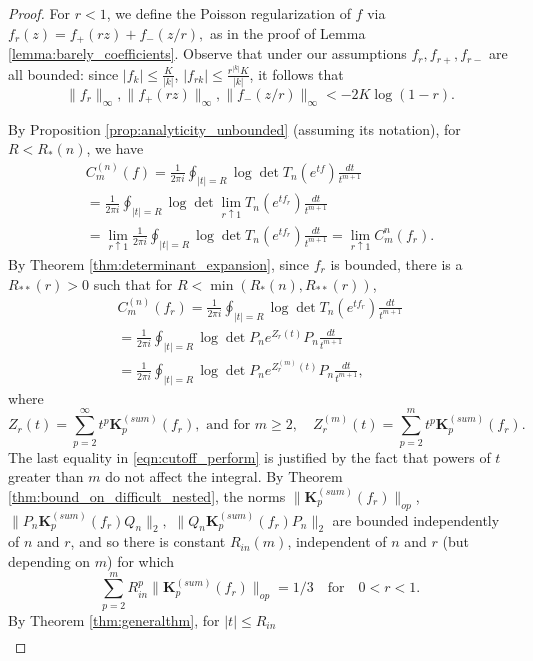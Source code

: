 \documentclass[11pt]{amsart}
\theoremstyle{plain}
\theoremstyle{remark}
\numberwithin{equation}{section}
\begin{document}
\begin{proof}
For $r<1$, we define the Poisson regularization of $f$ via $f_r(z)=f_+(rz)+ f_-(z/r),$ as in the proof of Lemma \ref{lemma:barely_coefficients}. Observe that under our assumptions $f_r, f_{r+}, f_{r-}$ are all bounded: since $|f_k|\leq \frac{K}{|k|}$, $|f_{rk}|\leq \frac{r^{|k|}K}{|k|}$, it follows that $$\|f_r\|_{\infty},\|f_+(rz)\|_{\infty},\|f_-({z/r})\|_{\infty}<-2K\log(1-r).$$


By Proposition \ref{prop:analyticity_unbounded} (assuming its notation), for $R<R_*(n)$, we have
\begin{multline}\label{eqn:approximation_C_m}
C_{m}^{(n)}(f)
= \frac{1}{2\pi i}\oint_{|t|=R}\log \det T_n(e^{tf})\frac{dt}{t^{m+1}}
\\=\frac{1}{2\pi i}\oint_{|t|=R}\log \det 
\lim_{r\uparrow 1} T_n(e^{tf_r})\frac{dt}{t^{m+1}}
\\=\lim_{r\uparrow 1}\frac{1}{2\pi i}\oint_{|t|=R}\log \det T_n(e^{tf_r})\frac{dt}{t^{m+1}}
=\lim_{r\uparrow 1} C_m^{n}(f_r).
\end{multline}
By Theorem \ref{thm:determinant_expansion}, since $f_r$ is bounded, there is a $R_{**}(r)>0$ such that for $R<\min(R_*(n), R_{**}(r))$,
\begin{multline}\label{eqn:cutoff_perform}
C_{m}^{(n)}(f_r)
= \frac{1}{2\pi i}\oint_{|t|=R}\log \det T_n(e^{tf_r})\frac{dt}{t^{m+1}}
\\=  \frac{1}{2\pi i}\oint_{|t|=R}\log \det P_n e^{Z_r(t)}P_n\frac{dt}{t^{m+1}}
\\=  \frac{1}{2\pi i}\oint_{|t|=R}\log \det P_n e^{Z_r^{(m)}(t)}P_n\frac{dt}{t^{m+1}}
,
\end{multline}
where
\begin{equation}
Z_r(t)=\sum_{p=2}^{\infty}t^p\mathbf{K}_p^{(sum)}(f_r), \text{ and for } m\geq 2,\quad Z_r^{(m)}(t)=\sum_{p=2}^{m}t^p\mathbf{K}_p^{(sum)}(f_r).
\end{equation}
The last equality in \eqref{eqn:cutoff_perform} is justified by the fact that powers of $t$ greater than $m$ do not affect the integral.
By Theorem \ref{thm:bound_on_difficult_nested}, the norms $\|\mathbf{K}_p^{(sum)}(f_r)\|_{op}$, $\|P_n\mathbf{K}_p^{(sum)}(f_r)Q_n\|_2,$ $\|Q_n\mathbf{K}_p^{(sum)}(f_r)P_n\|_2$ are bounded independently of $n$ and $r$, and so there is constant $R_{in}(m)$, independent of $n$ and $r$
(but depending on $m$) 
for which 
$$\sum_{p=2}^{m}R_{in}^p\|\mathbf{K}_p^{(sum)}(f_r)\|_{op}=1/3\quad\text{for}\quad 0<r<1.$$
By Theorem \ref{thm:generalthm}, for $|t|\leq R_{in}$
\begin{multline}

\end{multline}
\end{proof}
\end{document}
